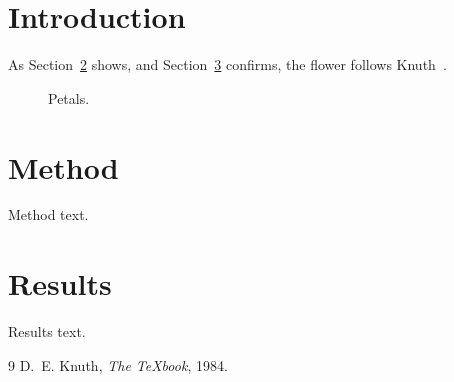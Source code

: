 \documentclass{article}
\begin{document}
\section{Introduction}
As Section~\ref{sec:method} shows, and Section~\ref{sec:results}
confirms, the flower follows Knuth~\cite{knuth84}.

\begin{figure}[h]
\centering
\newcommand\petals{5}
\caption{Petals.}
\end{figure}

\newpage
\section{Method}\label{sec:method}
Method text.

\newpage
\section{Results}\label{sec:results}
Results text.

\begin{thebibliography}{9}
 D.~E. Knuth, \emph{The \TeX book}, 1984.
\end{thebibliography}
\end{document}
